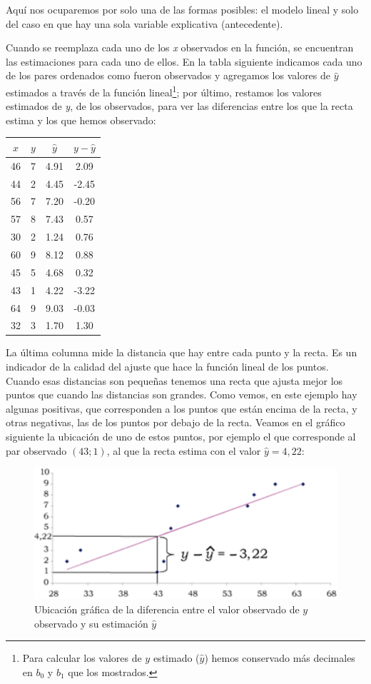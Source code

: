 \documentclass[]{book}
\let\rmarkdownfootnote\footnote%
\def\footnote{\protect\rmarkdownfootnote}
\begin{document}
Aquí nos ocuparemos por solo una de las formas posibles: el modelo lineal y solo del caso en que hay una sola variable explicativa (antecedente).

Cuando se reemplaza cada uno de los \emph{x} observados en la función, se
encuentran las estimaciones para cada uno de ellos. En la tabla
siguiente indicamos cada uno de los pares ordenados como fueron
observados y agregamos los valores de \(\widehat{y}\) estimados a través
de la función lineal\footnote{Para calcular los valores de \(y\) estimado (\(\widehat{y}\)) hemos conservado más decimales en \(b_0\) y \(b_1\) que los mostrados.}; por último, restamos los valores estimados de
\emph{y}, de los observados, para ver las diferencias entre los que la recta
estima y los que hemos observado:

\begin{longtable}[]{@{}cccc@{}}
\toprule
\(x\) & \(y\) & \(\widehat{y}\) & \(y - \widehat{y}\)\tabularnewline
\midrule
\endhead
46 & 7 & 4.91 & 2.09\tabularnewline
44 & 2 & 4.45 & -2.45\tabularnewline
56 & 7 & 7.20 & -0.20\tabularnewline
57 & 8 & 7.43 & 0.57\tabularnewline
30 & 2 & 1.24 & 0.76\tabularnewline
60 & 9 & 8.12 & 0.88\tabularnewline
45 & 5 & 4.68 & 0.32\tabularnewline
43 & 1 & 4.22 & -3.22\tabularnewline
64 & 9 & 9.03 & -0.03\tabularnewline
32 & 3 & 1.70 & 1.30\tabularnewline
\bottomrule
\end{longtable}

La última columna mide la distancia que hay entre cada punto y la recta.
Es un indicador de la calidad del ajuste que hace la función lineal de
los puntos. Cuando esas distancias son pequeñas tenemos una recta que
ajusta mejor los puntos que cuando las distancias son grandes. Como
vemos, en este ejemplo hay algunas positivas, que corresponden a los
puntos que están encima de la recta, y otras negativas, las de los
puntos por debajo de la recta. Veamos en el gráfico siguiente la
ubicación de uno de estos puntos, por ejemplo el que corresponde al par
observado \((43; 1)\), al que la recta estima con el valor \(\widehat{y} = 4,22\):

\begin{figure}

{\centering \includegraphics[width=4.86in]{imagenes/grafico13} 

}

\caption{Ubicación gráfica de la diferencia entre el valor observado de $y$ observado y su estimación $\widehat{y}$}\label{fig:unnamed-chunk-182}
\end{figure}
\end{document}
